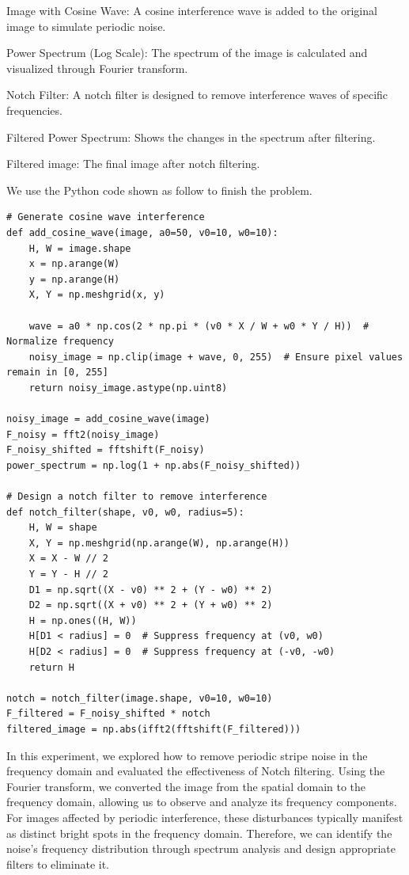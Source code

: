 \documentclass[12pt]{article}
\begin{document}
Image with Cosine Wave: A cosine interference wave is added to the original image to simulate periodic noise.

Power Spectrum (Log Scale): The spectrum of the image is calculated and visualized through Fourier transform.

Notch Filter: A notch filter is designed to remove interference waves of specific frequencies.

Filtered Power Spectrum: Shows the changes in the spectrum after filtering.

Filtered image: The final image after notch filtering.

We use the Python code shown as follow to finish the problem.
\begin{lstlisting}[caption={crucial Python Code Snippet},captionpos=b]
# Generate cosine wave interference
def add_cosine_wave(image, a0=50, v0=10, w0=10):
    H, W = image.shape
    x = np.arange(W)
    y = np.arange(H)
    X, Y = np.meshgrid(x, y)

    wave = a0 * np.cos(2 * np.pi * (v0 * X / W + w0 * Y / H))  # Normalize frequency
    noisy_image = np.clip(image + wave, 0, 255)  # Ensure pixel values remain in [0, 255]
    return noisy_image.astype(np.uint8)

noisy_image = add_cosine_wave(image)
F_noisy = fft2(noisy_image)
F_noisy_shifted = fftshift(F_noisy)
power_spectrum = np.log(1 + np.abs(F_noisy_shifted))

# Design a notch filter to remove interference
def notch_filter(shape, v0, w0, radius=5):
    H, W = shape
    X, Y = np.meshgrid(np.arange(W), np.arange(H))
    X = X - W // 2
    Y = Y - H // 2
    D1 = np.sqrt((X - v0) ** 2 + (Y - w0) ** 2)
    D2 = np.sqrt((X + v0) ** 2 + (Y + w0) ** 2)
    H = np.ones((H, W))
    H[D1 < radius] = 0  # Suppress frequency at (v0, w0)
    H[D2 < radius] = 0  # Suppress frequency at (-v0, -w0)
    return H

notch = notch_filter(image.shape, v0=10, w0=10)
F_filtered = F_noisy_shifted * notch
filtered_image = np.abs(ifft2(fftshift(F_filtered)))
\end{lstlisting}
In this experiment, we explored how to remove periodic stripe noise in the frequency domain and evaluated the effectiveness of Notch filtering. Using the Fourier transform, we converted the image from the spatial domain to the frequency domain, allowing us to observe and analyze its frequency components. For images affected by periodic interference, these disturbances typically manifest as distinct bright spots in the frequency domain. Therefore, we can identify the noise’s frequency distribution through spectrum analysis and design appropriate filters to eliminate it.
\end{document}
